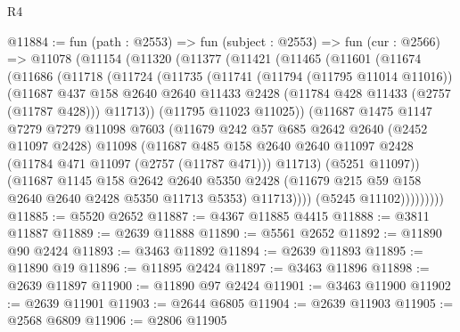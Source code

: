 \begin{lexlean}{R4}
\begin{coremodule}
@11884 := fun (path : @2553) =>
  fun (subject : @2553) =>
  fun (cur : @2566) =>
  @11078
    (@11154
      (@11320
        (@11377
          (@11421
            (@11465
              (@11601
                (@11674
                  (@11686
                    (@11718
                      (@11724
                        (@11735
                          (@11741
                            (@11794 (@11795 @11014 @11016))
                            (@11687
                              @437
                              @158
                              @2640
                              @2640
                              @11433
                              @2428
                              (@11784 @428 @11433 (@2757 (@11787 @428)))
                              @11713))
                          (@11795 @11023 @11025))
                        (@11687
                          @1475
                          @1147
                          @7279
                          @7279
                          @11098
                          @7603
                          (@11679
                            @242
                            @57
                            @685
                            @2642
                            @2640
                            (@2452 @11097 @2428)
                            @11098
                            (@11687
                              @485
                              @158
                              @2640
                              @2640
                              @11097
                              @2428
                              (@11784 @471 @11097 (@2757 (@11787 @471)))
                              @11713)
                            (@5251 @11097))
                          (@11687
                            @1145
                            @158
                            @2642
                            @2640
                            @5350
                            @2428
                            (@11679 @215 @59 @158 @2640 @2640 @2428 @5350 @11713 @5353)
                            @11713))))
                    (@5245 @11102)))))))))
@11885 := @5520 @2652
@11887 := @4367 @11885 @4415
@11888 := @3811 @11887
@11889 := @2639 @11888
@11890 := @5561 @2652
@11892 := @11890 @90 @2424
@11893 := @3463 @11892
@11894 := @2639 @11893
@11895 := @11890 @19
@11896 := @11895 @2424
@11897 := @3463 @11896
@11898 := @2639 @11897
@11900 := @11890 @97 @2424
@11901 := @3463 @11900
@11902 := @2639 @11901
@11903 := @2644 @6805
@11904 := @2639 @11903
@11905 := @2568 @6809
@11906 := @2806 @11905

\end{coremodule}
\end{lexlean}

